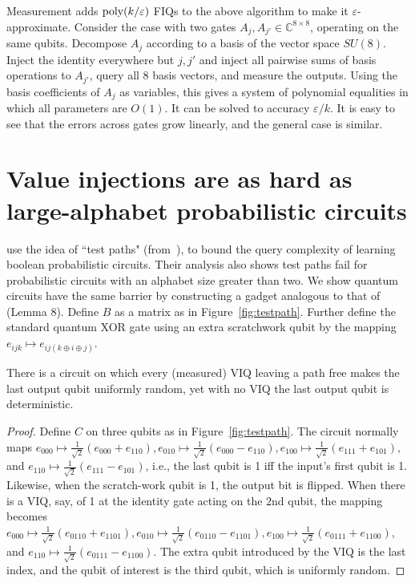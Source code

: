 \documentclass{colt2015}
\newcommand{\C}{\mathbb{C}}
\begin{document}
Measurement adds $\textup{poly}(k/\varepsilon)$ FIQs to the above algorithm
to make it $\varepsilon$-approximate.  Consider the case with two gates $A_j,
A_{j'} \in \C^{8 \times 8}$, operating on the same qubits. Decompose $A_j$
according to a basis of the vector space $SU(8)$. Inject the identity
everywhere but $j,j'$ and inject all pairwise sums of basis operations to
$A_{j'}$, query all 8 basis vectors, and measure the outputs. Using the basis
coefficients of $A_j$ as variables, this gives a system of polynomial
equalities in which all parameters are $O(1)$. It can be solved to accuracy
$\varepsilon/k$. It is easy to see that the errors across gates grow linearly, and the general case is
similar.

\section{Value injections are as hard as large-alphabet probabilistic circuits}
\label{sec:viq}

\cite{jAngluinACER09} use the idea of ``test paths" (from~\cite{AngluinACW2009}), to bound the query
complexity of learning boolean probabilistic circuits. Their analysis also shows
test paths fail for probabilistic circuits with an
alphabet size greater than two. We show quantum circuits have the same
barrier by constructing a gadget analogous to that of~\cite{jAngluinACER09}
(Lemma 8). Define $B$ as a matrix as in Figure~\ref{fig:testpath}. Further
define the standard quantum XOR gate using an extra scratchwork qubit by the
mapping $e_{ijk} \mapsto e_{ij(k \oplus i \oplus j)}$. 

\begin{lemma} \label{lem:testpath}
There is a circuit on which every (measured) VIQ 
leaving a path free makes the last output qubit uniformly random, yet with no VIQ
the last output qubit is deterministic.
\end{lemma}

\begin{proof}
Define $C$ on three qubits as in Figure~\ref{fig:testpath}. The
circuit normally maps $e_{000} \mapsto \frac{1}{\sqrt{2}}(e_{000} + e_{110}),  e_{010}
\mapsto \frac{1}{\sqrt{2}}(e_{000} - e_{110}),  e_{100} \mapsto
\frac{1}{\sqrt{2}}(e_{111} + e_{101}),$ and $e_{110} \mapsto
\frac{1}{\sqrt{2}}(e_{111} - e_{101})$, i.e., the last qubit is 1 iff the
input's first qubit is 1. Likewise, when the scratch-work qubit is 1, the
output bit is flipped. When there is a VIQ, say, of 1 at the identity gate
acting on the $2$nd qubit, the mapping  becomes $e_{000} \mapsto
\frac{1}{\sqrt{2}}(e_{0110} + e_{1101}), e_{010} \mapsto
\frac{1}{\sqrt{2}}(e_{0110} - e_{1101}), e_{100} \mapsto
\frac{1}{\sqrt{2}}(e_{0111} + e_{1100}),$ and $e_{110} \mapsto
\frac{1}{\sqrt{2}}(e_{0111} - e_{1100})$. The extra qubit introduced by the VIQ
is the last index, and the qubit of interest is the third qubit, which is
uniformly random.  \end{proof}
\end{document}
